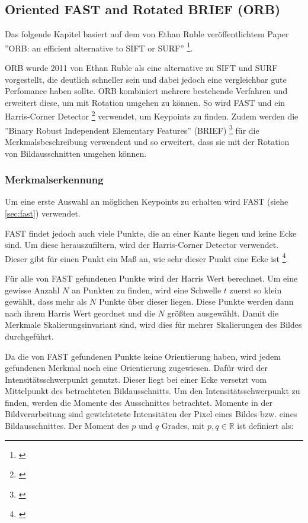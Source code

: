 \subsection{Oriented FAST and Rotated BRIEF (ORB)}
Das folgende Kapitel basiert auf dem von Ethan Ruble veröffentlichtem Paper ''ORB: an efficient alternative to SIFT or SURF'' \footnote{\cite{Rublee:2011:OEA:2355573.2356268,}}.

ORB wurde 2011 von Ethan Ruble als eine alternative zu SIFT und SURF vorgestellt, die deutlich schneller sein und dabei jedoch eine vergleichbar gute Perfomance haben sollte.
ORB kombiniert mehrere bestehende Verfahren und erweitert diese, um mit Rotation umgehen zu können. So wird FAST und ein Harris-Corner Detector \footnote{\cite{Harris88alvey}} verwendet, um Keypoints zu finden. Zudem werden die ''Binary Robust Independent
Elementary Features'' (BRIEF) \footnote{\cite{Calonder:2010:BBR:1888089.1888148,}} für die Merkmalsbeschreibung verwendent und so erweitert, dass sie mit der Rotation von Bildausschnitten umgehen können.

\subsubsection{Merkmalserkennung}

Um eine erste Auswahl an möglichen Keypoints zu erhalten wird FAST (siehe \ref{sec:fast}) verwendet.


FAST findet jedoch auch viele Punkte, die an einer Kante liegen und keine Ecke sind. Um diese herauszufiltern, wird der Harris-Corner Detector verwendet. Dieser gibt für einen Punkt ein Maß an, wie sehr dieser Punkt eine Ecke ist \footnote{\cite{Harris88alvey}}.


Für alle von FAST gefundenen Punkte wird der Harris Wert berechnet.
Um eine gewisse Anzahl $N$ an Punkten zu finden, wird  eine Schwelle $t$ zuerst so klein gewählt, dass mehr als $N$ Punkte über dieser liegen. Diese Punkte werden dann nach ihrem Harris Wert geordnet und die $N$ größten ausgewählt.
Damit die Merkmale Skalierungsinvariant sind, wird dies für mehrer Skalierungen des Bildes durchgeführt.

Da die von FAST gefundenen Punkte keine Orientierung haben, wird jedem gefundenen Merkmal noch eine Orientierung zugewiesen.
Dafür wird der Intensitätsschwerpunkt genutzt. Dieser liegt bei einer Ecke versetzt vom Mittelpunkt des betrachteten Bildausschnitts.
Um den Intensitätsschwerpunkt zu finden, werden die Momente des Ausschnittes betrachtet.
Momente in der Bildverarbeitung sind gewichtetete Intensitäten der Pixel eines Bildes bzw. eines Bildausschnittes.
Der Moment des $p$ und $q$ Grades, mit $p, q \in \mathbb{R}$ ist definiert als:

